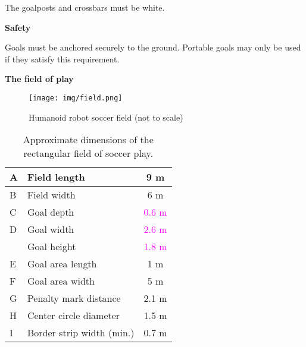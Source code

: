 \bigskip

The goalposts and crossbars must be white.

\bigskip

{\bfseries Safety}

\headlinebox

Goals must be anchored securely to the ground. Portable goals may only be used if they satisfy this requirement.

\bigskip

{\bfseries The field of play}

\headlinebox 

\begin{center}
\begin{figure}[h]
\texttt{[image: img/field.png]}
\caption{Humanoid robot soccer field (not to scale)}
\end{figure}
\end{center}
\newpage

\begin{center}
\tablehead{}
\begin{table}[h]
\caption{Approximate dimensions of the rectangular field of soccer play.}
\centering
\begin{tabular}{|l|l|c|}
\hline
A & Field length & 9 m\\
\hline
B & Field width &  6 m\\
\hline
C & Goal depth & \textcolor{magenta}{0.6 m}\\
\hline
D & Goal width & \textcolor{magenta}{2.6 m}\\
\hline
~ & Goal height & \textcolor{magenta}{1.8 m}\\
\hline
E & Goal area length & 1 m\\
\hline
F & Goal area width & 5 m\\
\hline
G & Penalty mark distance & 2.1 m\\
\hline
H & Center circle diameter & 1.5 m\\
\hline
I & Border strip width (min.) & 0.7 m\\
\hline
\end{tabular}
\end{table}
\end{center}



